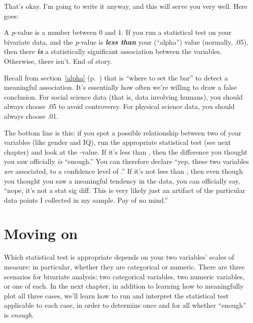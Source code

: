 That's okay. I'm going to write it anyway, and this will serve you very well. 
Here goes: 


\begin{shaded}
A \textit{p}-value is a number between 0 and 1. If you run a
statistical test on your bivariate data, and the \textit{p}-value is
\textbf{\textit{less than}} your  (``alpha'') value (normally, .05),
then there \textit{\textbf{is}} a statistically significant association between
the variables. Otherwise, there isn't. End of story.
\end{shaded}

Recall from section~\ref{alpha} (p.~\pageref{alpha}) that  is ``where
to set the bar'' to detect a meaningful association. It's essentially how often
we're willing to draw a false conclusion. For social science data (that is,
data involving humans), you should always choose .05 to avoid controversy. For
physical science data, you should always choose .01. 

The bottom line is this: if you spot a possible relationship between two of
your variables (like gender and IQ), run the appropriate statistical test (see
next chapter) and look at the -value. If it's less than , then the
difference you thought you saw officially \textit{is} ``enough.'' You can
therefore declare ``yep, these two variables \textit{are} associated, to a
confidence level of .'' If it's not less than , then even
though you thought you saw a meaningful tendency in the data, you can
officially say, ``nope, it's not a stat sig diff. This is very likely just an
artifact of the particular data points I collected in my sample. Pay of no
mind.''

\section{Moving on}

Which statistical test is appropriate depends on your two variables' scales of
measure: in particular, whether they are categorical or numeric. There are
three scenarios for bivariate analysis: two categorical variables, two numeric
variables, or one of each. In the next chapter, in addition to learning how to
meaningfully plot all three cases, we'll learn how to run and interpret the
statistical test applicable to each case, in order to determine once and for
all whether ``enough'' is \textit{enough}.
